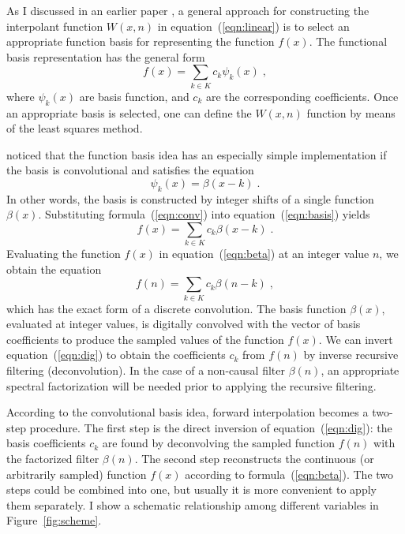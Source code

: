 As I discussed in an earlier paper \cite[]{Fomel.sep.94.sergey2}, a
general approach for constructing the interpolant function $W(x,n)$ in
equation~(\ref{eqn:linear}) is to select an appropriate function basis
for representing the function $f(x)$. The functional basis
representation has the general form
\begin{equation}\label{eqn:basis}
  f (x) = \sum_{k \in K} c_k \psi_k (x)\;,
\end{equation}
where $\psi_k(x)$ are basis function, and $c_k$ are the corresponding
coefficients. Once an appropriate basis is selected, one can define
the $W(x,n)$ function by means of the least squares method.
\par
\cite{unser1} noticed that the function basis idea has an
especially simple implementation if the basis is
convolutional and satisfies the equation
\begin{equation}
  \label{eqn:conv}
  \psi_k (x) = \beta (x-k)\;.
\end{equation}
In other words, the basis is constructed by integer shifts
of a single function $\beta(x)$. Substituting
formula~(\ref{eqn:conv}) into equation~(\ref{eqn:basis}) yields
\begin{equation}\label{eqn:beta}
  f (x) = \sum_{k \in K} c_k \beta (x - k)\;.
\end{equation}
Evaluating the function $f(x)$ in equation~(\ref{eqn:beta}) at an
integer value $n$, we obtain the equation
\begin{equation}\label{eqn:dig}
  f (n) = \sum_{k \in K} c_k \beta (n-k)\;,
\end{equation}
which has the exact form of a discrete convolution. The basis function
$\beta(x)$, evaluated at integer values, is digitally convolved with
the vector of basis coefficients to produce the sampled values of the
function $f(x)$. We can invert equation~(\ref{eqn:dig}) to obtain the
coefficients $c_k$ from $f(n)$ by inverse recursive filtering
(deconvolution). In the case of a non-causal filter $\beta(n)$, an 
appropriate spectral factorization will be
needed prior to applying the recursive filtering.
\par
According to the convolutional basis idea, forward interpolation
becomes a two-step procedure. The first step is the direct inversion
of equation~(\ref{eqn:dig}): the basis coefficients $c_k$ are found by
deconvolving the sampled function $f(n)$ with the factorized filter
$\beta(n)$. The second step reconstructs the continuous (or arbitrarily
sampled) function $f(x)$ according to formula~(\ref{eqn:beta}). The
two steps could be combined into one, but usually it is more
convenient to apply them separately. I show a schematic relationship
among different variables in Figure~\ref{fig:scheme}.

